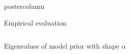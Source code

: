 \documentclass[final,hyperref={pdfpagelabels=false}]{beamer}
\begin{document}
\begin{frame}
\begin{columns}
\begin{column}{.49\textwidth}
\begin{beamercolorbox}[center,wd=\textwidth]{postercolumn}
\begin{minipage}[T]{.95\textwidth}
{\begin{block}{Empirical evaluation}
\begin{columns}
\begin{column}{.25\textwidth}
\begin{center}
      
    {\tiny Eigenvalues of model prior with shape $\alpha$}
    \vspace{-0.5em}

    \end{center}


\end{column}
\end{columns}
\end{block}}
\end{minipage}
\end{beamercolorbox}
\end{column}
\end{columns}
\end{frame}
\end{document}
